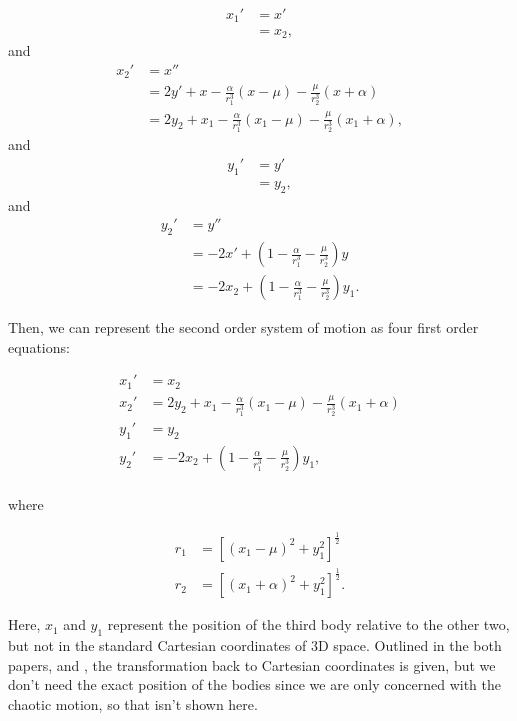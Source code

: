 \documentclass{article}
\begin{document}
\begin{align*}
    x_1' &= x' \\
    &= x_2,
\end{align*}
and
\begin{align*}
    x_2' &= x'' \\
    &= 2 y' + x
        - \frac{\alpha}{r_1^3} (x - \mu)
        - \frac{\mu}{r_2^3} (x + \alpha) \\
    &= 2 y_2 + x_1 - \frac{\alpha}{r_1^3} (x_1 - \mu)
        - \frac{\mu}{r_2^3} (x_1 + \alpha),
\end{align*}
and
\begin{align*}
    y_1' &= y' \\
    &= y_2,
\end{align*}
and
\begin{align*}
    y_2' &= y'' \\
    &= - 2 x' + \left(
        1 - \frac{\alpha}{r_1^3}
        - \frac{\mu}{r_2^3}
    \right) y \\
    &= - 2 x_2 + \left(
        1 - \frac{\alpha}{r_1^3}
        - \frac{\mu}{r_2^3}
    \right) y_1.
\end{align*}

Then, we can represent the second order system of motion as four first order
equations:

\begin{align}
    x_1' &= x_2 \nonumber \\
    x_2' &= 2 y_2 + x_1 - \frac{\alpha}{r_1^3} (x_1 - \mu)
        - \frac{\mu}{r_2^3} (x_1 + \alpha) \nonumber \\
    y_1' &= y_2 \nonumber \\
    y_2' &= - 2 x_2 + \left(
        1 - \frac{\alpha}{r_1^3}
        - \frac{\mu}{r_2^3}
    \right) y_1, \label{eq:reduce_3_body_prog_sys} \\
\end{align}

where 

\begin{align}
    r_1 &= \left[(x_1 - \mu)^2 + y_1^2\right]^{\frac{1}{2}} \nonumber \\
    r_2 &= \left[(x_1 + \alpha)^2 + y_1^2\right]^{\frac{1}{2}}.
\end{align}

Here, $x_1$ and $y_1$ represent the position of the third body relative to
the other two, but not in the standard Cartesian coordinates of 3D space.
Outlined in the both papers, \cite{eberle2007case} and \cite{frnkacase}, the
transformation back to Cartesian coordinates is given, but we don't need the
exact position of the bodies since we are only concerned with the chaotic
motion, so that isn't shown here.
\end{document}
